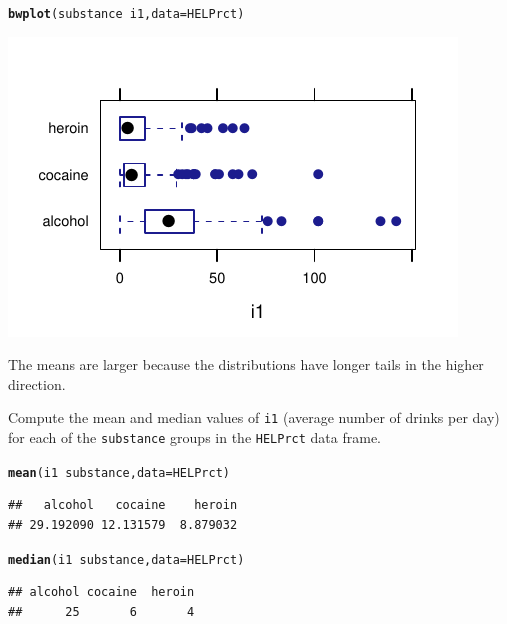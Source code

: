 \documentclass[twoside]{book}\usepackage[]{graphicx}\usepackage[]{xcolor}
\makeatletter
\def\maxwidth{ %
  \ifdim\Gin@nat@width>\linewidth
    \linewidth
  \else
    \Gin@nat@width
  \fi
}
\newcommand{\hlopt}[1]{\textcolor[rgb]{0,0,0}{#1}}%
\newcommand{\hlstd}[1]{\textcolor[rgb]{0.345,0.345,0.345}{#1}}%
\newcommand{\hlkwc}[1]{\textcolor[rgb]{0.333,0.667,0.333}{#1}}%
\newcommand{\hlkwd}[1]{\textcolor[rgb]{0.737,0.353,0.396}{\textbf{#1}}}%
\newenvironment{kframe}{%
 \def\at@end@of@kframe{}%
 \ifinner\ifhmode%
  \def\at@end@of@kframe{\end{minipage}}%
  \begin{minipage}{\columnwidth}%
 \fi\fi%
 \def\FrameCommand##1{\hskip\@totalleftmargin \hskip-\fboxsep
 \colorbox{shadecolor}{##1}\hskip-\fboxsep
     \hskip-\linewidth \hskip-\@totalleftmargin \hskip\columnwidth}%
 \MakeFramed {\advance\hsize-\width
   \@totalleftmargin\z@ \linewidth\hsize
   \@setminipage}}%
 {\par\unskip\endMakeFramed%
 \at@end@of@kframe}
\newenvironment{knitrout}{}{} %
\newcommand{\variable}[1]{{\color{green!50!black}\texttt{#1}}}
\newcommand{\Rindex}[1]{\index{\texttt{#1}}}
\newcommand{\dataframe}[1]{{\color{blue!80!black}\texttt{#1}}\Rindex{#1}}
\makeatother
\begin{document}
\begin{solution}
\begin{knitrout}
\color{fgcolor}\begin{kframe}
\begin{alltt}
\hlkwd{bwplot}\hlstd{(substance} \hlopt{~} \hlstd{i1,} \hlkwc{data} \hlstd{= HELPrct)}
\end{alltt}
\end{kframe}

{\centering \includegraphics[width=\maxwidth]{figures/fig-unnamed-chunk-44-1} 

}



\end{knitrout}
	The means are larger because the distributions have longer tails in the 
	higher direction.  
\end{solution}

\begin{problem}
	Compute the mean and median values of \variable{i1} (average number of
	drinks per day) for each of the \variable{substance} groups in the 
	\dataframe{HELPrct} data frame.
\end{problem}

\begin{solution}
\begin{knitrout}
\color{fgcolor}\begin{kframe}
\begin{alltt}
\hlkwd{mean}\hlstd{(i1} \hlopt{~} \hlstd{substance,} \hlkwc{data} \hlstd{= HELPrct)}
\end{alltt}
\begin{verbatim}
##   alcohol   cocaine    heroin 
## 29.192090 12.131579  8.879032
\end{verbatim}
\begin{alltt}
\hlkwd{median}\hlstd{(i1} \hlopt{~} \hlstd{substance,} \hlkwc{data} \hlstd{= HELPrct)}
\end{alltt}
\begin{verbatim}
## alcohol cocaine  heroin 
##      25       6       4
\end{verbatim}
\end{kframe}
\end{knitrout}
\end{solution}
\end{document}
